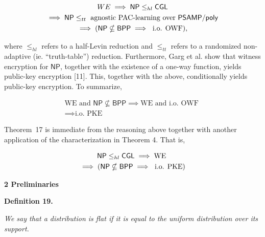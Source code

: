 \[\begin{gathered}
WE \displaystyle\implies{\mathsf{NP}}\leq_{hl}{\sf CGL} \\
\displaystyle\implies{\mathsf{NP}}\leq_{tt}\text{ agnostic PAC-learning over }{\mathsf{P}}{\mathsf{SAMP}}/{\mathsf{poly}} \\
\displaystyle\implies({\mathsf{NP}}\nsubseteq{\mathsf{BPP}}\implies\text{ i.o. OWF}),
\end{gathered}\]


where $\leq_{hl}$ refers to a half-Levin reduction and $\leq_{tt}$ refers to a randomized non-adaptive (ie. “truth-table”) reduction. Furthermore, Garg et al. show that witness encryption for ${\mathsf{NP}}$, together with the existence of a one-way function, yields public-key encryption [11]. This, together with the above, conditionally yields public-key encryption. To summarize,\par


\[\begin{gathered}
\displaystyle\text{WE and }{\mathsf{NP}}\nsubseteq{\mathsf{BPP}} \displaystyle\implies\text{WE and i.o. OWF } \\
\displaystyle\implies\text{i.o. PKE}
\end{gathered}\]




Theorem 17 is immediate from the reasoning above together with another application of the characterization in Theorem 4. That is,\par


\[\begin{gathered}
\displaystyle{\mathsf{NP}}\leq_{hl}{\sf CGL} \displaystyle\implies\text{WE } \\
\displaystyle\implies({\mathsf{NP}}\nsubseteq{\mathsf{BPP}}\implies\text{ i.o. PKE})
\end{gathered}\]







\par\medskip\noindent\textbf{
2 Preliminaries}\par





\par\medskip\noindent\textbf{
\textbf{Definition 19}\textbf{.}
}\par



\emph{We say that a distribution is flat if it is equal to the uniform distribution over its support.}\par



